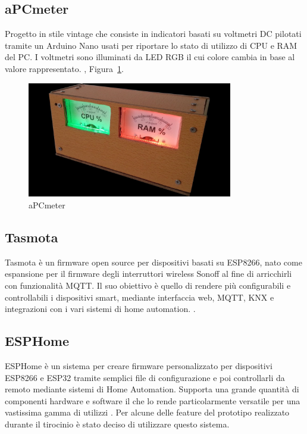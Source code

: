 \documentclass[12pt,a4paper]{report}
\begin{document}
\subsection{aPCmeter}
Progetto in stile vintage che consiste in indicatori basati su voltmetri DC pilotati tramite un Arduino Nano usati per riportare lo stato di
utilizzo di CPU e RAM del PC. I voltmetri sono illuminati da LED RGB il cui colore cambia in base al valore rappresentato.
\cite{apcmeter}, Figura~\ref{fig:apcmeter}.

\begin{figure}[h]
  \centering
  \includegraphics[width=0.8\textwidth]{apcmeter}
  \caption{aPCmeter \cite{apcmeter}}
  \label{fig:apcmeter}
\end{figure}


\subsection{Tasmota}
Tasmota è un firmware open source per dispositivi basati su ESP8266, nato come espansione per il firmware degli interruttori
wireless Sonoff al fine di arricchirli con funzionalità MQTT. Il suo obiettivo è quello di rendere più configurabili e controllabili i dispositivi
smart, mediante interfaccia web, MQTT, KNX e integrazioni con i vari sistemi di home automation.
\cite{abouttasmota}.

\subsection{ESPHome}
ESPHome è un sistema per creare firmware personalizzato per dispositivi ESP8266 e ESP32 tramite semplici file di configurazione e poi controllarli
da remoto mediante sistemi di Home Automation.
Supporta una grande quantità di componenti hardware e software il che lo rende particolarmente versatile per una vastissima gamma di utilizzi
\cite{esphomeio}.
Per alcune delle feature del prototipo realizzato durante il tirocinio è stato deciso di utilizzare questo sistema.
\end{document}
